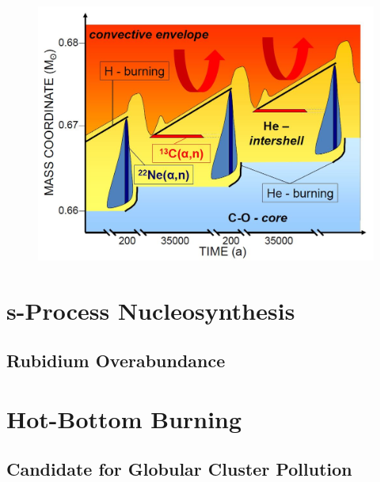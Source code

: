 \begin{figure}[t]
\centering
\includegraphics[width=6.5in]{Chapter-1/figs/sProcess_AGB.JPG}
\caption{\label{fig:AGB_Structure}}
\end{figure}

\section{s-Process Nucleosynthesis}


\subsection{Rubidium Overabundance}


\section{Hot-Bottom Burning}


\subsection{Candidate for Globular Cluster Pollution}
